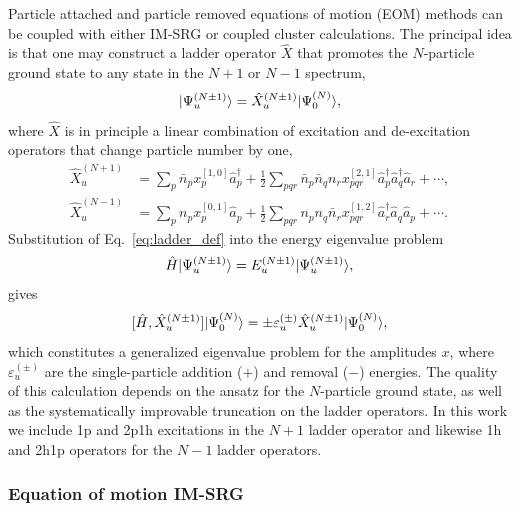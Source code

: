 Particle attached and particle removed equations of motion (EOM)
methods can be coupled with either IM-SRG or coupled cluster
calculations. The principal idea is that one may construct a ladder
operator $\hat{X}$ that promotes the $N$-particle ground state to any
state in the $N + 1$ or $N - 1$ spectrum,
\begin{equation}\label{eq:ladder_def}
  | \Psi^{(N \pm 1)}_u \rangle  = \hat{X}^{(N \pm 1)}_u | \Psi^{(N)}_0 \rangle,
\end{equation}
where $\hat{X}$ is in principle a linear combination of excitation and
de-excitation operators that change particle number by one,
\begin{align}
  \label{eq:gen_attached}
  \hat{X}^{(N+1)}_u &= \sum_p \bar{n}_p x^{[1,0]}_p  \hat{a}^\dagger_p + \frac{1}{2} \sum_{pqr} \bar{n}_p \bar{n}_q n_r x^{[2,1]}_{pqr} \hat{a}^\dagger_p \hat{a}^\dagger_q \hat{a}_r + \cdots,  \\
  \label{eq:gen_removed}
  \hat{X}^{(N-1)}_u &= \sum_p n_p x_p^{[0,1]} \hat{a}_p + \frac{1}{2} \sum_{pqr} n_p n_q \bar{n}_r  x^{[1,2]}_{pqr} \hat{a}^\dagger_r \hat{a}_q \hat{a}_p  + \cdots.
\end{align}
Substitution of Eq.~\eqref{eq:ladder_def} into the energy eigenvalue problem
\begin{gather*}
  \hat H | \Psi_u^{(N \pm 1)} \rangle = E^{(N\pm1)}_u | \Psi_u^{(N \pm 1)} \rangle,
\end{gather*}
gives
\begin{equation}\label{eq:EOM}
  [\hat{H}, \hat{X}^{(N \pm 1)}_u] | \Psi^{(N)}_0 \rangle = \pm \varepsilon^{(\pm)}_u \hat{X}^{(N \pm 1)}_u | \Psi^{(N)}_0 \rangle,
\end{equation}
which constitutes a generalized eigenvalue problem for the amplitudes
$x$, where $\varepsilon^{(\pm)}_u$ are the single-particle addition
($+$) and removal ($-$) energies. The quality of this calculation
depends on the ansatz for the $N$-particle ground state, as well as
the systematically improvable truncation on the ladder operators. In
this work we include 1p and 2p1h excitations in the $N + 1$ ladder
operator and likewise 1h and 2h1p operators for the $N - 1$ ladder
operators.

\subsubsection*{Equation of motion IM-SRG}

